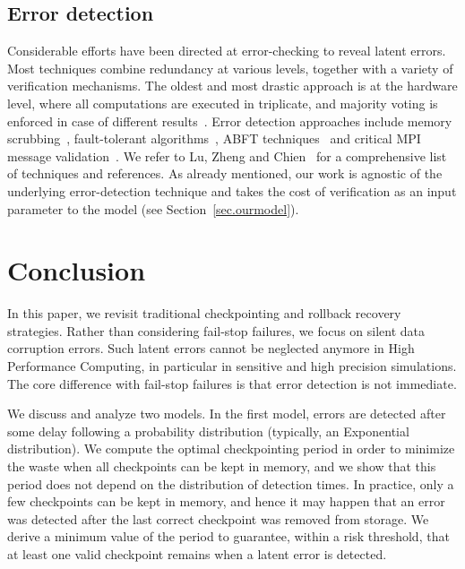 \documentclass[10pt,table]{article}
\begin{document}
\subsection{Error detection}

Considerable efforts have been directed at error-checking to reveal latent errors.
Most techniques combine redundancy at various levels, together with a variety
of verification mechanisms. The oldest and most drastic approach is at the hardware level,
where all computations are executed in triplicate, and majority voting is enforced in case
of different results~\cite{Lyons1962}. Error detection approaches include 
memory scrubbing~\cite{Hwang2012}, fault-tolerant 
algorithms~\cite{Bronevetsky2008,Heroux2011,Shantharam2011}, ABFT 
techniques~\cite{Kuang1984,Bosilca2009} and critical MPI message validation~\cite{Fiala2012}.
We refer to Lu, Zheng and Chien~\cite{LuZhengChien2013} for a comprehensive list
of techniques and references. As already mentioned, our work is agnostic of the underlying
error-detection technique and takes the cost of verification as an input parameter to the model
(see Section~\ref{sec.ourmodel}).


\section{Conclusion}
\label{sec.conclusion}


In this paper, we revisit traditional checkpointing  and rollback recovery strategies.
Rather than considering fail-stop failures, we focus on silent data corruption errors.
Such latent errors cannot be neglected anymore in High Performance Computing, in particular
in sensitive and high precision simulations. The core difference with fail-stop failures is
that error detection is not immediate.

We discuss and analyze two models. In the first model, errors are detected after some delay following a
probability distribution (typically, an Exponential distribution). We compute the optimal 
checkpointing period in order to minimize the waste when all checkpoints can be kept in memory,
and we show that this period does not depend on the distribution of detection times. In practice,
only a few checkpoints can be kept in memory, and hence it may happen
that an error was detected after
the last correct checkpoint was removed from storage. We derive a minimum value of the period
 to guarantee, within a risk threshold,  that at least one valid
 checkpoint remains when a latent error is detected. 
\end{document}
